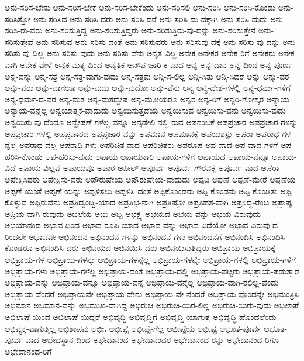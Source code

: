 {ಅನು-ಸರಿಸ-ಬೇಕು
ಅನು-ಸರಿಸ-ಬೇಕೆ
ಅನು-ಸರಿಸ-ಬೇಕೆಂದು
ಅನು-ಸರಿಸಲಿ
ಅನು-ಸರಿಸಿ
ಅನು-ಸರಿಸಿ-ಕೊಂಡು
ಅನು-ಸರಿಸಿತ್ತೋ
ಅನು-ಸರಿಸಿದ
ಅನು-ಸರಿಸಿ-ದರು
ಅನು-ಸರಿಸಿ-ದರೆ
ಅನು-ಸರಿಸಿ-ದು-ದಕ್ಕಾಗಿ
ಅನು-ಸರಿಸಿ-ದುದು
ಅನು-ಸರಿಸಿ-ರು-ವರು
ಅನು-ಸರಿಸುತ್ತಿದ್ದ
ಅನು-ಸರಿಸುತ್ತಿದ್ದರು
ಅನು-ಸರಿಸುತ್ತಿರು-ವು-ದನ್ನು
ಅನು-ಸರಿಸುತ್ತೇನೆ
ಅನು-ಸರಿಸುತ್ತೇವೆ
ಅನು-ಸರಿಸುವ
ಅನು-ಸರಿಸು-ವಂತೆ
ಅನು-ಸರಿಸುವರು
ಅನು-ಸರಿಸುವು-ದಕ್ಕೆ
ಅನು-ಸರಿಸು-ವು-ದನ್ನು
ಅನು-ಸರಿಸು-ವು-ದಿಲ್ಲ
ಅನು-ಸರಿಸು-ವುದು
ಅನು-ಸರಿಸು-ವೆನು
ಅನೃತ-ವಿಲ್ಲ
ಅನೇಕ
ಅನೇಕರ
ಅನೇಕ-ರಿಗೆ
ಅನೇಕರು
ಅನೇಕ-ವಾಗಿ
ಅನೇಕ-ವೇಳೆ
ಅನೈಕ-ಮತ್ಯ-ದಿಂದ
ಅನೈತಿಕ
ಅನೌಪ-ಚಾರಿ-ಕ-ವಾದ
ಅನ್ನ
ಅನ್ನ-ದಾನ
ಅನ್ನ-ದಿಂದ
ಅನ್ನ-ಪೂರ್ಣ
ಅನ್ನ-ವನ್ನು
ಅನ್ನ-ಸತ್ರ
ಅನ್ನ-ಸತ್ರ-ವಾಗು-ವುದು
ಅನ್ನ-ಸತ್ರವು
ಅನ್ನಿ-ಸ-ಲಿಲ್ಲ
ಅನ್ನಿ-ಸಿತು
ಅನ್ನಿ-ಸಿದರೆ
ಅನ್ನು
ಅನ್ನು-ವರ
ಅನ್ನು-ವರು
ಅನ್ನು-ವಾಗಲೂ
ಅನ್ನು-ವುದು
ಅನ್ನು-ವುದೋ
ಅನ್ನು-ವೆನು
ಅನ್ಯ
ಅನ್ಯ-ದೇಶ-ಗಳಲ್ಲಿ
ಅನ್ಯ-ಧರ್ಮ-ಗಳಿಗೆ
ಅನ್ಯ-ಧರ್ಮ-ದ-ವರ
ಅನ್ಯ-ಮತ
ಅನ್ಯ-ಮತದ್ವೇಷ
ಅನ್ಯ-ಮತೀಯರೂ
ಅನ್ಯರ
ಅನ್ಯ-ರಿಗೆ
ಅನ್ಯರಿ-ಗೋಸ್ಕರ
ಅನ್ಯಾಯ
ಅನ್ಯಾಯ-ವನ್ನೆಲ್ಲ
ಅನ್ವಯಾತ್ಮಕ-ವಾದುದು
ಅನ್ವಯಿಸುತ್ತದೆಯೆ
ಅನ್ವಯಿಸುವ
ಅನ್ವಯಿಸು-ವನು
ಅನ್ವಯಿಸು-ವುದು
ಅನ್ವಯಿಸು-ವು-ದೆಂದೂ
ಅನ್ವೇಷಣೆ-ಗಳೆಲ್ಲ-ವನ್ನೂ
ಅನ್ಸಡೇಲಿ-ನಲ್ಲಿ-ರುವ
ಅಪನಂಬಿಕೆ
ಅಪಪ್ರಚಾರ
ಅಪಪ್ರಚಾರ-ಗಳನ್ನು
ಅಪಪ್ರಚಾರ-ಗಳಲ್ಲಿ
ಅಪಪ್ರಚಾರದ
ಅಪಪ್ರಚಾರ-ವನ್ನು
ಅಪಮಾನ
ಅಪಮಾನಕ್ಕೆ
ಅಪಯಶಸ್ಸು
ಅಪರಾ
ಅಪರಾಧ-ಗಳ-ನ್ನೆಲ್ಲ
ಅಪರಾಧ-ವಲ್ಲ
ಅಪರಾಧಿ-ಗಳು
ಅಪರಿಚಿತ-ನಾದ
ಅಪರಿಚಿತರು
ಅಪರೂಪ
ಅಪ-ವಾದ
ಅಪ-ವಾದ-ಗಳಿಗೆ
ಅಪ-ಹರಿಸಿ-ಕೊಂಡು
ಅಪ-ಹರಿಸು-ವುದು
ಅಪಾಯ
ಅಪಾಯಕಾರಿ
ಅಪಾಯ-ಗಳಿಗೆ
ಅಪಾಯದ
ಅಪಾಯ-ವನ್ನೂ
ಅಪಾಯ-ವಿದೆ
ಅಪಾಯ-ವಿಲ್ಲವೆ
ಅಪಾಯವೂ
ಅಪಾರ
ಅಪೀಲ್
ಅಪೂರ್ವ
ಅಪೂರ್ವ-ಗೌರವಕ್ಕೆ
ಅಪೂರ್ವ-ವಾದ
ಅಪೆರಾ
ಅಪೇಕ್ಷಿಸಿದರು
ಅಪೇಕ್ಷಿಸು-ವರು
ಅಪೌರುಷೇಯ
ಅಪೌರುಷೇಯ-ವಾದುದು
ಅಪ್ಪಟ
ಅಪ್ಪಣೆ
ಅಪ್ಪಣೆ-ಮೇರೆ
ಅಪ್ಪಣೆಯ
ಅಪ್ಪಣೆ-ಯಂತೆ
ಅಪ್ಪಣೆ-ಯನ್ನು
ಅಪ್ಪಳಿಸಲು
ಅಪ್ಪಳಿಸಿ-ದಂತೆ
ಅಪ್ಪಿಕೊಂಂಡರು
ಅಪ್ಪಿ-ಕೊಂಡನು
ಅಪ್ಪಿ-ಕೊಂಡಿತು
ಅಪ್ಪಿ-ಕೊಳ್ಳುವ
ಅಪ್ಪಿರುವೆನು
ಅಪ್ರತಿದ್ವಂದ್ವಿ-ಯಾದ
ಅಪ್ರತಿಭ-ನಾಗಿ
ಅಪ್ರತಿಷ್ಠೋ
ಅಪ್ರತಿಹತ-ವಾಗಿ
ಅಪ್ರಸಿದ್ಧ-ರೆಂಬ
ಅಪ್ರಾಪ್ಯ
ಅಪ್ರಿಯ-ವಾಗಿ-ರುವುದು
ಅಬಲೆಯ
ಅಬು
ಅಬ್ಬ
ಅಭಕ್ಷ್ಯ
ಅಭಯದ
ಅಭಯ-ವನ್ನು
ಅಭಯ-ವಿರುವುದು
ಅಭಯಾನಂದ
ಅಭಾವ-ದಿಂದ
ಅಭಾವ-ರೂಪಿ-ಯಾದ
ಅಭಾವ-ವನ್ನು
ಅಭಾವ-ವಿದೆಯೋ
ಅಭಾವ-ವಿರುವು-ದ-ರಿಂದಲೇ
ಅಭಾವವೇ
ಅಭಿನಂದನ
ಅಭಿನಂದನೆ-ಗಳನ್ನು
ಅಭಿನಂದನೆ-ಗಳು
ಅಭಿನಂದನೆಗೆ
ಅಭಿನಂದಿಸಿ
ಅಭಿನಂದಿಸಿ-ಕೊಂಡರೂ
ಅಭಿನಂದಿಸಿ-ದರು
ಅಭಿನಯದ
ಅಭಿನಯಿಸಿ-ದರು
ಅಭಿನಯಿಸುತ್ತಿದ್ದರು
ಅಭಿಪ್ರಾಯ
ಅಭಿಪ್ರಾಯಕ್ಕೆ
ಅಭಿಪ್ರಾಯ-ಗಳ
ಅಭಿಪ್ರಾಯ-ಗಳನ್ನು
ಅಭಿಪ್ರಾಯ-ಗಳನ್ನೆಲ್ಲ
ಅಭಿಪ್ರಾಯ-ಗಳನ್ನೇ
ಅಭಿಪ್ರಾಯ-ಗಳಲ್ಲಿ
ಅಭಿಪ್ರಾಯ-ಗಳಿಗೆ
ಅಭಿಪ್ರಾಯ-ಗಳು
ಅಭಿಪ್ರಾಯ-ಗಳೆಲ್ಲ
ಅಭಿಪ್ರಾಯ-ದಂತೆ
ಅಭಿಪ್ರಾಯ-ದಲ್ಲಿ
ಅಭಿಪ್ರಾಯ-ಪಟ್ಟರು
ಅಭಿಪ್ರಾಯ-ಪಡುತ್ತಾರೆ
ಅಭಿಪ್ರಾಯ-ವನ್ನು
ಅಭಿಪ್ರಾಯ-ವನ್ನೂ
ಅಭಿಪ್ರಾಯ-ವನ್ನೆ
ಅಭಿಪ್ರಾಯ-ವನ್ನೆಲ್ಲ
ಅಭಿಪ್ರಾಯ-ವಾಗಿ-ರಲಿಲ್ಲ-ವೆಂದು
ಅಭಿಪ್ರಾಯ-ವೆಂದರೆ
ಅಭಿಪ್ರಾಯವೇ
ಅಭಿಪ್ರಾಯ-ವೇನು
ಅಭಿಪ್ರಾಯ-ವೇ-ನೆಂದರೆ
ಅಭಿಪ್ರಾಯ-ವೊಂದನ್ನೇ
ಅಭಿಮಂತ್ರಿಸಿ
ಅಭಿಮಾನ
ಅಭಿಮಾನ-ವನ್ನು
ಅಭಿಮುಖ-ವಾಗಿದ್ದ
ಅಭಿರುಚಿ
ಅಭಿರುಚಿ-ಯಿರ-ಲಿಲ್ಲ
ಅಭಿರುಚಿ-ಯಿರು-ವುದು
ಅಭಿಲಾಷೆ
ಅಭಿಲಾಷೆ-ಯಿಂದ
ಅಭಿಲಾಷೆ-ಯಿದ್ದರೆ
ಅಭಿವೃದ್ಧಿ
ಅಭಿವೃದ್ಧಿಗೆ
ಅಭಿವೃದ್ಧಿ-ಯಾಗುತ್ತ
ಅಭಿವೃದ್ಧಿ-ಹೊಂದಲೆಂದು
ಅಭಿವ್ಯಕ್ತ-ವಾಗುತ್ತಿಲ್ಲ
ಅಭಿಶಾಪವು
ಅಭೀಃ
ಅಭೀಪ್ಸೆ
ಅಭೀಪ್ಸೆ-ಗೆಲ್ಲ
ಅಭೀಪ್ಸೆಯ
ಅಭೀಷ್ಟ
ಅಭೂತ-ಪೂರ್ವ
ಅಭೂತ-ಪೂರ್ವ-ವಾದ
ಅಭೇದಸ್ಥಾನ-ದಿಂದ
ಅಭೇದಾನಂದ
ಅಭೇದಾನಂದರ
ಅಭೇದಾನಂದ-ರನ್ನು
ಅಭೇದಾನಂದ-ರಿಗೂ
ಅಭೇದಾನಂದ-ರಿಗೆ
}
